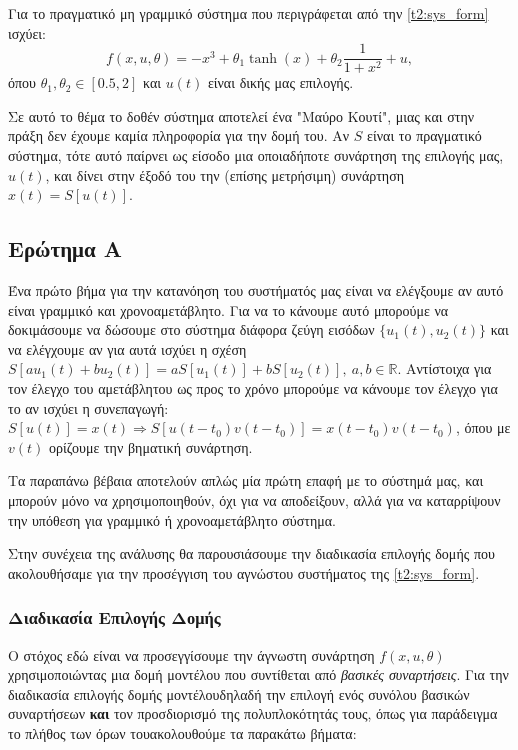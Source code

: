 \documentclass[12pt]{article} %
\numberwithin{equation}{section}  %
\begin{document}
Για το πραγματικό μη γραμμικό σύστημα που περιγράφεται από την \eqref{t2:sys_form} ισχύει:
\begin{equation}\label{t2:f_true}
    f(x, u, \theta) = - x^3 + \theta_1 \tanh(x) + \theta_2 \frac{1}{1 + x^2} + u, 
\end{equation}
όπου $\theta_1, \theta_2 \in [0.5, 2]$ και $u(t)$ είναι δικής μας επιλογής. 

Σε αυτό το θέμα το δοθέν σύστημα αποτελεί ένα "Μαύρο Κουτί", μιας και στην πράξη δεν έχουμε καμία πληροφορία για την δομή του. 
Αν $S$ είναι το πραγματικό σύστημα, τότε αυτό παίρνει ως είσοδο μια οποιαδήποτε συνάρτηση της επιλογής μας, $u(t)$, 
και δίνει στην έξοδό του την (επίσης μετρήσιμη) συνάρτηση $x(t) = S[u(t)]$.


\subsection{Ερώτημα Α}
Ένα πρώτο βήμα για την κατανόηση του συστήματός μας είναι να ελέγξουμε αν αυτό είναι γραμμικό και χρονοαμετάβλητο.
Για να το κάνουμε αυτό μπορούμε να δοκιμάσουμε να δώσουμε στο σύστημα διάφορα ζεύγη εισόδων $\{u_1(t), u_2(t)\}$
και να ελέγχουμε αν για αυτά ισχύει η σχέση $S[au_1(t) + bu_2(t)] = aS[u_1(t)] + bS[u_2(t)],\ a,b \in \mathbb{R}$.
Αντίστοιχα για τον έλεγχο του αμετάβλητου ως προς το χρόνο μπορούμε να κάνουμε τον έλεγχο για το αν ισχύει η συνεπαγωγή: 
$S[u(t)] = x(t) \Rightarrow S[u(t - t_0)v(t-t_0)] = x(t-t_0)v(t-t_0)$, όπου με $v(t)$ ορίζουμε την βηματική συνάρτηση. 

Τα παραπάνω βέβαια αποτελούν απλώς μία πρώτη επαφή με το σύστημά μας, και μπορούν μόνο να χρησιμοποιηθούν, όχι για να αποδείξουν, αλλά για να 
καταρρίψουν την υπόθεση για γραμμικό ή χρονοαμετάβλητο σύστημα. 

Στην συνέχεια της ανάλυσης θα παρουσιάσουμε την διαδικασία επιλογής δομής που ακολουθήσαμε για την προσέγγιση του αγνώστου συστήματος της \eqref{t2:sys_form}.


\subsubsection{Διαδικασία Επιλογής Δομής}

Ο στόχος εδώ είναι να προσεγγίσουμε την άγνωστη συνάρτηση \(f(x, u, \theta)\) χρησιμοποιώντας μια δομή μοντέλου που συντίθεται από \textit{βασικές συναρτήσεις}. 
Για την διαδικασία επιλογής δομής μοντέλου\textemdash δηλαδή την επιλογή ενός συνόλου βασικών συναρτήσεων \textbf{και} τον προσδιορισμό της πολυπλοκότητάς τους, όπως για παράδειγμα το πλήθος των όρων του\textemdash ακολουθούμε τα παρακάτω βήματα:
\end{document}

